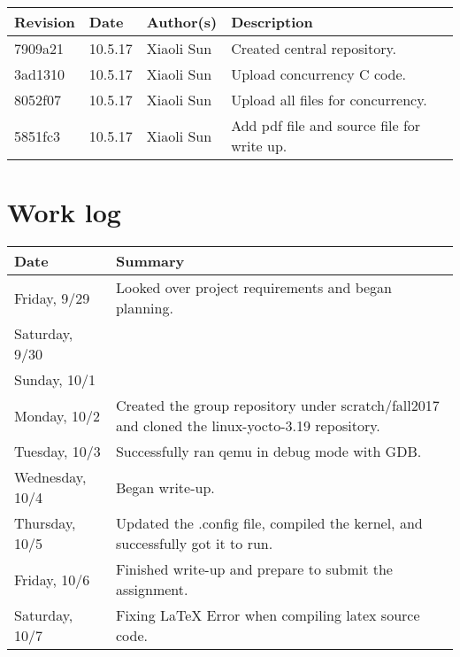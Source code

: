 \documentclass[10pt,letterpaper]{article}
\begin{document}
\begin{tabular}{|l|l|l|p{6cm}|} \hline
Revision & Date & Author(s) & Description\\ \hline
7909a21 & 10.5.17 & Xiaoli Sun & Created central repository.\\ \hline
3ad1310 & 10.5.17 & Xiaoli Sun & Upload concurrency C code.\\ \hline
8052f07 & 10.5.17 & Xiaoli Sun & Upload all files for concurrency.\\ \hline
5851fc3 & 10.5.17 & Xiaoli Sun & Add pdf file and source file for write up.\\ \hline

\end{tabular}



\section{Work log}

\textbf{}

\begin{tabular}{|l|p{12cm}|} \hline
Date & Summary\\ \hline
Friday, 9/29 & Looked over project requirements and began planning.\\ \hline
Saturday, 9/30 &\\ \hline
Sunday, 10/1 &\\ \hline
Monday, 10/2 & Created the group repository under scratch/fall2017 and cloned the linux-yocto-3.19 repository. \\\hline
Tuesday, 10/3 &  Successfully ran qemu in debug mode with GDB. \\ \hline
Wednesday, 10/4 & Began write-up. \\ \hline
Thursday, 10/5 & Updated the .config file, compiled the kernel, and successfully got it to run. \\ \hline
Friday, 10/6 & Finished write-up and prepare to submit the assignment.\\ \hline
Saturday, 10/7 & Fixing LaTeX Error when compiling latex source code. \\ \hline

\end{tabular}
\end{document}
